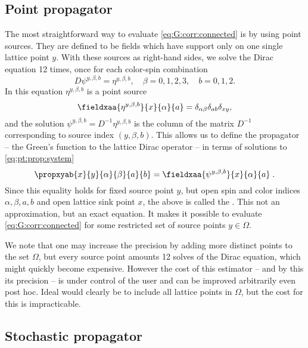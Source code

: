 \subsection{Point propagator}

The most straightforward way to evaluate \cref{eq:G:corr:connected} is by using point sources. They are defined to be fields which have support only on one single lattice point $y$. With these sources as right-hand sides, we solve the Dirac equation \num{12} times, once for each color-spin combination
\begin{equation} \label{eq:pt:prop:system}
D \psi^{y, \beta, b} = \eta^{y, \beta, b},
\quad
\beta = 0,1,2,3,
\quad
b = 0,1,2.
\end{equation}
In this equation $\eta^{y, \beta, b}$ is a point source
\begin{equation}
\fieldxaa{\eta^{y, \beta, b}}{x}{\alpha}{a} = \delta_{\alpha \beta} \delta_{ab} \delta_{xy},
\end{equation}
and the solution $\psi^{y, \beta, b} = D^{-1} \eta^{y, \beta, b}$ is the column of the matrix $D^{-1}$ corresponding to source index $(y, \beta, b)$.
This allows us to define the propagator -- the Green's function to the lattice Dirac operator -- in terms of solutions to \cref{eq:pt:prop:system}
\begin{equation} \label{eq:prop:pt-to-all}
\propxyab{x}{y}{\alpha}{\beta}{a}{b} = \fieldxaa{\psi^{y, \beta, b}}{x}{\alpha}{a} \;.
\end{equation}
Since this equality holds for fixed source point $y$, but open spin and color indices $\alpha, \beta, a, b$ and open lattice sink point $x$, the above is called the .
This not an approximation, but an exact equation.
It makes it possible to evaluate \cref{eq:G:corr:connected} for some restricted set of source points $y \in \Omega$.

We note that one may increase the precision by adding more distinct points to the set $\Omega$, but every source point amounts \num{12} solves of the Dirac equation, which might quickly become expensive.
However the cost of this estimator -- and by this its precision -- is under control of the user and can be improved arbitrarily even post hoc.
Ideal would clearly be to include all lattice points in $\Omega$, but the cost for this is impracticable.

\subsection{Stochastic propagator}
\label{sec:stochastic:prop}

